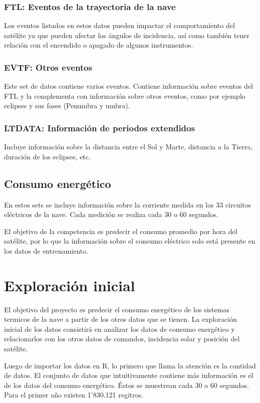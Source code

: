 \documentclass[../Main.tex]{subfiles}
\begin{document}
\subsubsection*{FTL: Eventos de la trayectoria de la nave}
Los eventos listados en estos datos pueden impactar el comportamiento del satélite ya que pueden afectar los ángulos de incidencia, así como también tener relación con el encendido o apagado de algunos instrumentos.
\subsubsection*{EVTF: Otros eventos}
Este set de datos contiene varios eventos. Contiene información sobre eventos del FTL y la complementa con información sobre otros eventos, como por ejemplo eclipses y sus fases (Penumbra y umbra).
\subsubsection*{LTDATA: Información de periodos extendidos}
Incluye información sobre la distancia entre el Sol y Marte, distancia a la Tierra, duración de los eclipses, etc.

\subsection*{Consumo energético}
En estos sets se incluye información sobre la corriente medida en los 33 circuitos eléctricos de la nave. Cada medición se realiza cada 30 o 60 segundos. 
\newline \par El objetivo de la competencia es predecir el consumo promedio por hora del satélite, por lo que la información sobre el consumo eléctrico solo está presente en los datos de entrenamiento.

\section{Exploración inicial}
El objetivo del proyecto es predecir el consumo energético de los sistemas termicos de la nave a partir de los otros datos que se tienen. La exploración inicial de los datos consistirá en analizar los datos de consumo energético y relacionarlos con los otros datos de comandos, incidencia solar y posición del satélite.

Luego de importar los datos en R, lo primero que llama la atención es la cantidad de datos. El conjunto de datos que intuitivamente contiene más información es el de los datos del consumo energético. Éstos se muestrean cada 30 o 60 segundos. Para el primer año existen 1'830.121 regitros.
\end{document}
